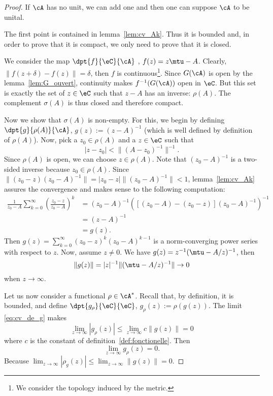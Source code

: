 \begin{proof}
	If $\cA$ has no unit, we can add one and then one can suppose $\cA$ to be unital.

	The first point is contained in lemma~\ref{lem:cv_Ak}. Thus it is bounded and, in order to prove that it is compact, we only need to prove that it is closed.

	We consider the map $\dpt{f}{\eC}{\cA}$ , $f(z)=z\mtu-A$. Clearly, $\|f(z+\delta)-f(z)\|=\delta$, then $f$ is continuous\footnote{We consider the topology induced by the metric.}. Since $G(\cA)$ is open by the lemma~\ref{lem:G_ouvert}, continuity makes $f^{-1}(G(\cA))$ open in $\eC$. But this set is exactly the set of $z\in\eC$ such that $z-A$ has an inverse: $\rho(A)$. The complement $\sigma(A)$ is thus closed and therefore compact.

	Now we show that $\sigma(A)$ is non-empty. For this, we begin by defining $\dpt{g}{\rho(A)}{\cA}$,
	$g(z):=(z-A)^{-1}$ (which is well defined by definition of $ \rho(A)$). Now, pick a $z_0\in\rho(A)$ and a $z\in\eC$ such that
	\[
	   |z-z_0|<\| (A-z_0)^{-1} \|^{-1}.
	\]
	Since $\rho(A)$ is open, we can choose $z\in\rho(A)$. Note that $(z_0-A)^{-1}$ is a two-sided inverse because $z_0\in\rho(A)$. Since $\| (z_0-z)(z_0-A)^{-1} \|=|z_0-z|\| (z_0-A)^{-1} \|<1$,  lemma~\ref{lem:cv_Ak} assures the convergence and makes sense to the following computation:
	\begin{equation}
	\begin{split}
	   \frac{1}{z_0-A}\sum_{k=0}^{\infty}(\frac{z_0-z}{z_0-A})^k
	      &=   (z_0-A)^{-1}\left(   [(z_0-A)-(z_0-z)](z_0-A)^{-1}
	       \right)^{-1}\\
	      &=(z-A) ^{-1}\\
	      &=g(z).
	\end{split}
	\end{equation}
	Then $g(z)=\sum_{k=0}^{\infty}(z_0-z)^k(z_0-A)^{k-1}$ is a norm-converging power series with respect to $z$. Now, assume $z\neq 0$. We have $g(z)=z^{-1}(\mtu-A/z)^{-1}$, then
	\begin{equation}\label{eq:cv_de_g}
	   \|g(z)\|=|z|^{-1}\| (\mtu-A/z)^{-1} \|\to 0
	\end{equation}
	when $z\to\infty$.

	Let us now consider a functional $\rho\in\cA^*$. Recall that, by definition, it is bounded, and define
	$\dpt{g_{\rho}}{\eC}{\eC}$,
	$g_{\rho}(z):=\rho(g(z))$. The limit \eqref{eq:cv_de_g} makes
	\[
	\lim_{z\to\infty}|g_{\rho}(z)|\leq\lim_{z\to\infty}c\|g(z)\|=0
	\]
	where $c$ is the constant of definition~\ref{def:fonctionelle}. Then
	\begin{equation}\label{eq:limite_g_rho}
	  \lim_{z\to\infty}g_{\rho}(z)=0.
	\end{equation}
	Because $\lim_{z\to\infty}| \rho_g(z) |\leq\lim_{z\to\infty}\| g(z) \|=0$.


\end{proof}
